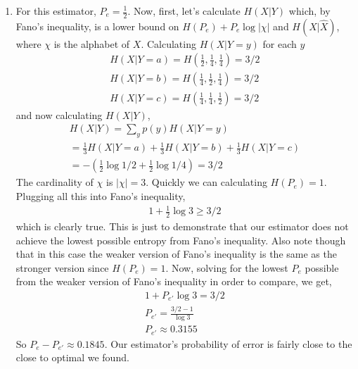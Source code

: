 \documentclass[10pt,twoside]{article}
\begin{document}
\begin{itemize}
\begin{enumerate}
\begin{proof}[Answer.]
    \end{proof}
    \item For this estimator, $P_e = \frac{1}{2}$. Now, first, let's calculate $H(X|Y)$ which, by Fano's inequality, is a lower bound on $H(P_e) + P_e\log|\chi|$ and $H(X|\hat{X})$, where $\chi$ is the alphabet of $X$. Calculating $H(X|Y=y)$ for each $y$
    \begin{gather*}
        H(X|Y=a) = H(\frac{1}{2}, \frac{1}{4}, \frac{1}{4}) = 3/2 \\
        H(X|Y=b) = H(\frac{1}{4}, \frac{1}{2}, \frac{1}{4}) = 3/2  \\
        H(X|Y=c) = H(\frac{1}{4}, \frac{1}{4}, \frac{1}{2}) = 3/2 
    \end{gather*}
    and now calculating $H(X|Y)$,
    \begin{gather*}
        H(X|Y) = \sum_yp(y)H(X|Y=y) \\
        = \frac{1}{3}H(X|Y=a) + \frac{1}{3}H(X|Y=b) + \frac{1}{3}H(X|Y=c) \\
        = -(\frac{1}{2}\log 1/2 + \frac{1}{2}\log 1/4) = 3/2
    \end{gather*}
    The cardinality of $\chi$ is $|\chi| = 3$. Quickly we can calculating $H(P_e) = 1$. Plugging all this into Fano's inequality,
    \begin{gather*}
        1 + \frac{1}{2}\log 3 \geq 3/2
    \end{gather*}
    which is clearly true. This is just to demonstrate that our estimator does not achieve the lowest possible entropy from Fano's inequality. Also note though that in this case the weaker version of Fano's inequality is the same as the stronger version since $H(P_e) = 1$. Now, solving for the lowest $P_e$ possible from the weaker version of Fano's inequality in order to compare, we get,
    \begin{gather*}
       1 + P_{e'}\log 3 = 3/2 \\
       P_{e'} = \frac{3/2 - 1}{\log 3} \\
        P_{e'}\approx 0.3155
    \end{gather*}
    So $P_e - P_{e'} \approx 0.1845$. Our estimator's probability of error is fairly close to the close to optimal we found.
    \end{enumerate}
\end{itemize}

\label{LastPage}
\end{document}

